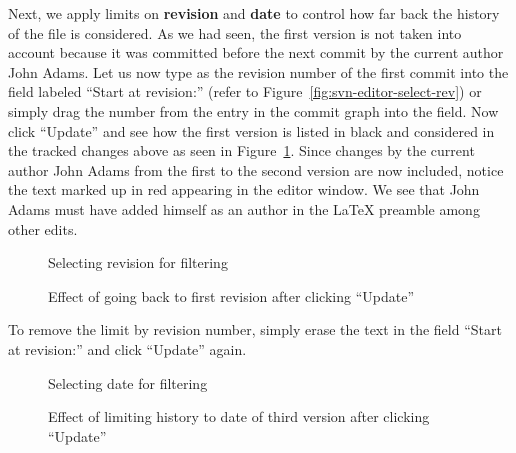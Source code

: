 Next, we apply limits on \textbf{revision} and \textbf{date} to control how far back the history of the file is considered.  As we had seen, the first version is not taken into account because it was committed before the next commit by the current author John Adams.  Let us now type  as the revision number of the first commit into the field labeled ``Start at revision:'' (refer to Figure~\ref{fig:svn-editor-select-rev}) or simply drag the number from the entry in the commit graph into the field.  Now click ``Update'' and see how the first version is listed in black and considered in the tracked changes above as seen in Figure~\ref{fig:svn-editor-limit-rev}.  Since changes by the current author John Adams from the first to the second version are now included, notice the text marked up in red appearing in the editor window. We see that John Adams must have added himself as an author in the LaTeX preamble among other edits.

\begin{figure}
\centering
  \begin{minipage}[t]{0.35\linewidth}
  \centering
  \caption{Selecting revision for filtering} \label{fig:svn-editor-select-rev}
  \end{minipage}%
\hspace{0.04\linewidth}%
  \begin{minipage}[t]{0.61\linewidth}
  \centering
  \caption[Effect of going back to first revision]{Effect of going back to first revision after clicking ``Update''} \label{fig:svn-editor-limit-rev}
  \end{minipage}  
\end{figure}

To remove the limit by revision number, simply erase the text in the field ``Start at revision:'' and click ``Update'' again.

\begin{figure}
\centering
  \begin{minipage}[t]{0.35\linewidth}
  \centering
  \caption{Selecting date for filtering} \label{fig:svn-editor-select-date}
  \end{minipage}%
\hspace{0.04\linewidth}%
  \begin{minipage}[t]{0.61\linewidth}
  \centering
  \caption[Effect of limiting history to date of third version]{Effect of limiting history to date of third version after clicking ``Update''} \label{fig:svn-editor-limit-date}
  \end{minipage}  
\end{figure}

